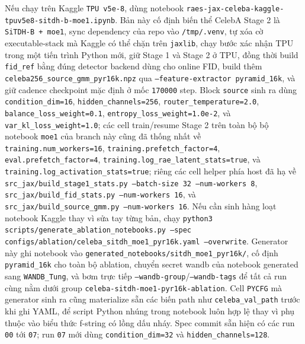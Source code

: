 Nếu chạy trên Kaggle \texttt{TPU v5e-8}, dùng notebook
\texttt{raes-jax-celeba-kaggle-tpuv5e8-sitdh-b-moe1.ipynb}. Bản này cố định biến thể
CelebA Stage 2 là \texttt{SiTDH-B + moe1}, sync dependency của repo vào
\texttt{/tmp/.venv}, tự xóa cờ executable-stack mà Kaggle có thể chặn trên
\texttt{jaxlib}, chạy bước xác nhận TPU trong một tiến trình Python mới, giữ
Stage 1 và Stage 2 ở TPU, đồng thời build \texttt{fid\_ref} bằng đúng detector
backend dùng cho online FID, build thêm
\texttt{celeba256\_source\_gmm\_pyr16k.npz} qua
\texttt{--feature-extractor pyramid\_16k}, và giữ cadence checkpoint mặc định ở
mốc \texttt{170000} step. Block
\texttt{source} sinh ra dùng
\texttt{condition\_dim=16}, \texttt{hidden\_channels=256},
\texttt{router\_temperature=2.0}, \texttt{balance\_loss\_weight=0.1},
\texttt{entropy\_loss\_weight=1.0e-2}, và
\texttt{var\_kl\_loss\_weight=1.0}; các cell train/resume Stage 2 trên toàn bộ
bộ notebook \texttt{moe1} của branch này cũng đã thống nhất về
\texttt{training.num\_workers=16},
\texttt{training.prefetch\_factor=4},
\texttt{eval.prefetch\_factor=4},
\texttt{training.log\_rae\_latent\_stats=true}, và
\texttt{training.log\_activation\_stats=true}; riêng các cell helper phía host
đã hạ về \texttt{src\_jax/build\_stage1\_stats.py --batch-size 32 --num-workers
8}, \texttt{src\_jax/build\_fid\_stats.py --num-workers 16}, và
\texttt{src\_jax/build\_source\_gmm.py --num-workers 16}.
Nếu cần sinh hàng loạt notebook Kaggle thay vì sửa tay từng bản, chạy
\texttt{python3 scripts/generate\_ablation\_notebooks.py --spec
configs/ablation/celeba\_sitdh\_moe1\_pyr16k.yaml --overwrite}. Generator này
ghi notebook vào \texttt{generated\_notebooks/sitdh\_moe1\_pyr16k/}, cố định
\texttt{pyramid\_16k} cho toàn bộ ablation, chuyển secret wandb của notebook
generated sang \texttt{WANDB\_Tung}, và bơm trực tiếp
\texttt{--wandb-group}/\texttt{--wandb-tags} để tất cả run cùng nằm dưới group
\texttt{celeba-sitdh-moe1-pyr16k-ablation}. Cell \texttt{PYCFG} mà generator
sinh ra cũng materialize sẵn các biến path như \texttt{celeba\_val\_path}
trước khi ghi YAML, để script Python nhúng trong notebook luôn hợp lệ thay vì
phụ thuộc vào biểu thức f-string có lồng dấu nháy. Spec commit sẵn hiện có các
run \texttt{00} tới \texttt{07}; run \texttt{07} mới dùng
\texttt{condition\_dim=32} và \texttt{hidden\_channels=128}.

